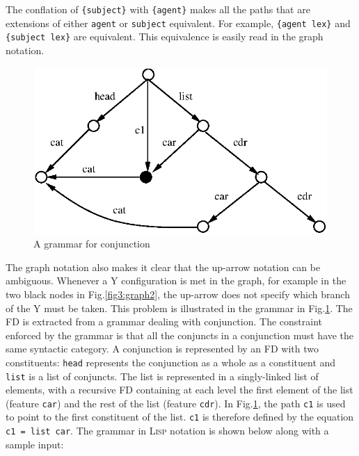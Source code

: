 \documentclass[10pt,a4paper]{report}
\begin{document}
The conflation of {\tt \{subject\}} with {\tt \{agent\}} makes all the paths that
are extensions of either {\tt agent} or {\tt subject} equivalent.  For example,
{\tt \{agent lex\}} and {\tt \{subject lex\}} are equivalent.  This equivalence is
easily read in the graph notation.

\begin{figure}[p]
    \centering
    \includegraphics[width=5in, height=2.5in]{graph32.eps}
    \caption{A grammar for conjunction}
    \label{fig3:graph3}
\end{figure}

\label{relpath-ambiguity}
The graph notation also makes it clear that the up-arrow notation can be
ambiguous.  Whenever a Y configuration is met in the graph, for example in
the two black nodes in Fig.\ref{fig3:graph2}, the up-arrow does not specify
which branch of the Y must be taken.  This problem is illustrated in the
grammar in Fig.\ref{fig3:graph3}. The FD is extracted from a grammar
dealing with conjunction.  The constraint enforced by the grammar is that
all the conjuncts in a conjunction must have the same syntactic category.
A conjunction is represented by an FD with two constituents: {\tt head}
represents the conjunction as a whole as a constituent and {\tt list} is a
list of conjuncts.  The list is represented in a singly-linked list of
elements, with a recursive FD containing at each level the first element of
the list (feature {\tt car}) and the rest of the list (feature {\tt cdr}).  In
Fig.\ref{fig3:graph3}, the path {\tt c1} is used to point to the first
constituent of the list.  {\tt c1} is therefore defined by the equation
{\tt {c1} = {list car}}.  The grammar in \textsc{Lisp} notation is shown below
along with a sample input:
\end{document}
